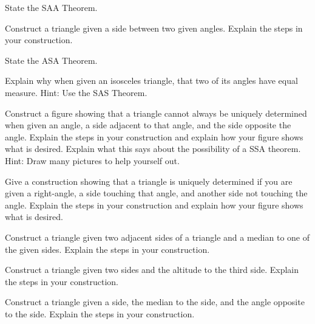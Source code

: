 \documentclass[nooutcomes]{ximera}
\begin{document}
\begin{problem}
State the SAA Theorem.
\end{problem}

\begin{problem}
Construct a triangle given a side between two given
  angles. Explain the steps in your construction.
\end{problem}

\begin{problem}
State the ASA Theorem.
\end{problem}

\begin{problem}
Explain why when given an isosceles triangle, that two
  of its angles have equal measure. Hint: Use the SAS Theorem.
\end{problem}

\begin{problem}
Construct a figure showing that a triangle cannot always be
  uniquely determined when given an angle, a side adjacent to that
  angle, and the side opposite the angle. Explain the steps in your
  construction and explain how your figure shows what is
  desired. Explain what this says about the possibility of a SSA
  theorem.  Hint: Draw many pictures to help yourself out.
\end{problem}

\begin{problem}
Give a construction showing that a triangle is uniquely
  determined if you are given a right-angle, a side touching that
  angle, and another side not touching the angle. Explain the steps in
  your construction and explain how your figure shows what is desired.
\end{problem}

\begin{problem}
Construct a triangle given two adjacent sides of a triangle and
  a median to one of the given sides. Explain the steps in your
  construction.
\end{problem}

\begin{problem}
Construct a triangle given two sides and the altitude to the
  third side. Explain the steps in your construction.
\end{problem}

\begin{problem}
Construct a triangle given a side, the median to the side, and
  the angle opposite to the side. Explain the steps in your
  construction.
\end{problem}
\end{document}
